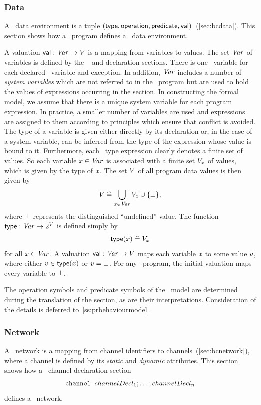 \subsubsection{Data}
A \bcandle\ data environment is a tuple 
$(\mathop{\sf type}, \mathop{\sf operation}, \mathop{\sf predicate}, {\mathop{\sf val}})$~(\Sec\ref{sec:bcdata}). This section
shows how a \candle\ program defines a \bcandle\ data environment.
 
A valuation ${\mathop{\sf val}} : {\text{\it Var\/}} \rightarrow V$ is a mapping from variables to values.
The set ${\text{\it Var\/}}$ of variables is defined by the \candle\  and
 declaration sections. There is one \bcandle\ variable
for each declared \candle\ variable and exception. In addition, ${\text{\it Var\/}}$
includes a number of \emph{system variables} which are not referred to
in the \candle\ program but are used to hold the values of expressions
occurring in the  section. In constructing the formal
model, we assume that there is a unique system variable for each
program expression.  In practice, a smaller number of variables are
used and expressions are assigned to them according to principles
which ensure that conflict is avoided. The type of a variable is given
either directly by its declaration or, in the case of a system
variable, can be inferred from the type of the expression whose value
is bound to it. Furthermore, each \sdml\ type expression clearly
denotes a finite set of values. So each variable $x \in {\text{\it Var\/}}$ is
associated with a finite set $V_x$ of values, which is given by the
type of $x$.  The set $V$ of all program data values is then given by
\[V \mathrel{\widehat=} \bigcup_{x \in {\text{\it Var\/}}} V_x \cup \{\bot\},\] 
where $\bot$ represents the distinguished ``undefined'' value. 
The function $\mathop{\sf type} : {\text{\it Var\/}} \rightarrow 2^V$ is defined simply by
\[ \mathop{\sf type}(x) \mathrel{\widehat=} V_x \]
for all $x \in {\text{\it Var\/}}$. A valuation ${\mathop{\sf val}} : {\text{\it Var\/}} \rightarrow V$ maps each
variable $x$ to some value ${v}$, where either ${v} \in \mathop{\sf type}(x)$ or
${v} = \bot$. For any \candle\ program, the initial valuation 
maps every variable to $\bot$.
 
The operation symbols and predicate symbols of the \bcandle\ model are
determined during the translation of the  section, as
are their interpretations. Consideration of the details is deferred 
to~\Sec\ref{ss:prbehaviourmodel}.

\subsubsection{Network}
A \bcandle\ network is a mapping from channel identifiers
to channels~(\Sec\ref{sec:bcnetwork}), where a channel is defined by its
\emph{static} and \emph{dynamic} attributes. This section shows how 
a \candle\ channel declaration section 
\[\mbox{\tt channel } channelDecl_1 ; \ldots ; channelDecl_n\]
defines a \bcandle\ network.

